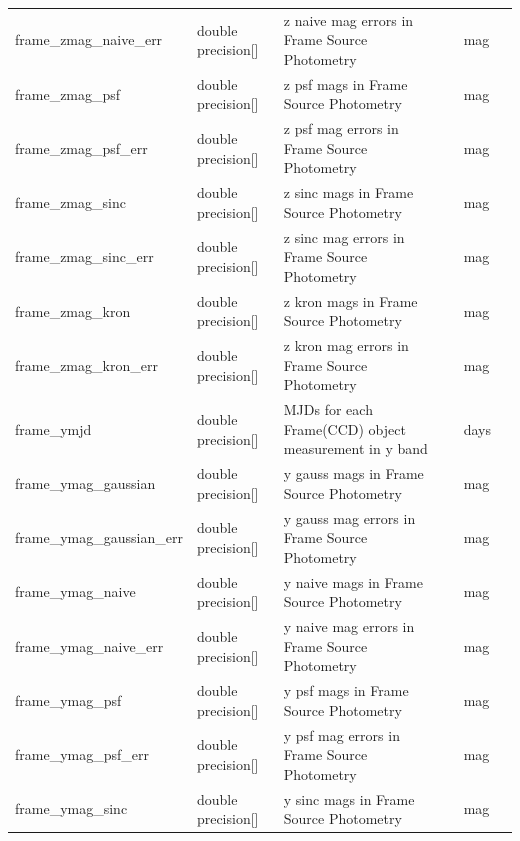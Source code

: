 \documentclass[12pt]{article}
\begin{document}
\begin{table}[thbp]
\begin{center}
{\begin{tabular}{llllll}
frame\_zmag\_naive\_err & double precision[] & z naive mag errors in Frame Source Photometry          &                        & mag            &   \\
frame\_zmag\_psf & double precision[] & z psf mags in Frame Source Photometry          &                        & mag            &   \\
frame\_zmag\_psf\_err & double precision[] & z psf mag errors in Frame Source Photometry          &                        & mag            &   \\
frame\_zmag\_sinc & double precision[] & z sinc mags in Frame Source Photometry          &                        & mag            &   \\
frame\_zmag\_sinc\_err & double precision[] & z sinc mag errors in Frame Source Photometry          &                        & mag            &   \\
frame\_zmag\_kron & double precision[] & z kron mags in Frame Source Photometry          &                        & mag            &   \\
frame\_zmag\_kron\_err & double precision[] & z kron mag errors in Frame Source Photometry          &                        & mag            &   \\
frame\_ymjd & double precision[] & MJDs for each Frame(CCD) object measurement in y band     &                        & days            &   \\
frame\_ymag\_gaussian & double precision[] & y gauss mags in Frame Source Photometry          &                        & mag            &   \\
frame\_ymag\_gaussian\_err & double precision[] & y gauss mag errors in Frame Source Photometry          &                        & mag            &   \\
frame\_ymag\_naive & double precision[] & y naive mags in Frame Source Photometry          &                        & mag            &   \\
frame\_ymag\_naive\_err & double precision[] & y naive mag errors in Frame Source Photometry          &                        & mag            &   \\
frame\_ymag\_psf & double precision[] & y psf mags in Frame Source Photometry          &                        & mag            &   \\
frame\_ymag\_psf\_err & double precision[] & y psf mag errors in Frame Source Photometry          &                        & mag            &   \\
frame\_ymag\_sinc & double precision[] & y sinc mags in Frame Source Photometry          &                        & mag            &   \\

\end{tabular}}
\end{center}
\end{table}
\end{document}
